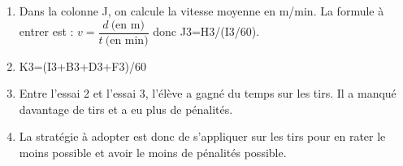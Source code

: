 \begin{enumerate}
\begin{enumerate}
			\item Dans la colonne J, on calcule la vitesse moyenne en m/min. La formule à entrer est : $v=\dfrac{d~\text{(en m)}}{t~\text{(en min)}}$ donc J3=H3/(I3/60).
			
			\item K3=(I3+B3+D3+F3)/60
			
			\item Entre l'essai 2 et l'essai 3, l'élève a gagné du temps sur les tirs. Il a manqué davantage de tirs et a eu plus de pénalités.
			
			\item La stratégie à adopter est donc de s'appliquer sur les tirs pour en rater le moins possible et avoir le moins de pénalités possible.
			
		\end{enumerate}
\end{enumerate}